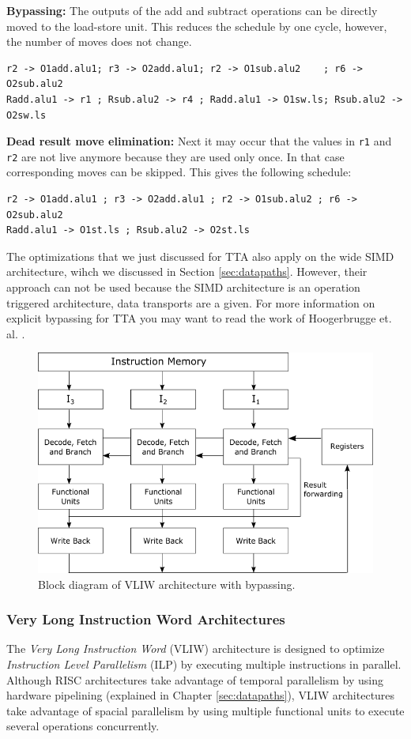 \textbf{Bypassing:} The outputs of the add and subtract operations can be directly moved to the load-store unit. This reduces the schedule by one cycle, however, the number of moves does not change.

\begin{lstlisting}
r2 -> O1add.alu1; r3 -> O2add.alu1; r2 -> O1sub.alu2    ; r6 -> O2sub.alu2
Radd.alu1 -> r1 ; Rsub.alu2 -> r4 ; Radd.alu1 -> O1sw.ls; Rsub.alu2 -> O2sw.ls
\end{lstlisting}

\textbf{Dead result move elimination:} Next it may occur that the values in \texttt{r1} and \texttt{r2} are not live anymore because they are used only once. In that case corresponding moves can be skipped. This gives the following schedule:

\begin{lstlisting}
r2 -> O1add.alu1 ; r3 -> O2add.alu1 ; r2 -> O1sub.alu2 ; r6 -> O2sub.alu2 
Radd.alu1 -> O1st.ls ; Rsub.alu2 -> O2st.ls
\end{lstlisting}

The optimizations that we just discussed for TTA also apply on the wide SIMD architecture, wihch we discussed in Section \ref{sec:datapaths}. However, their approach can not be used because the SIMD architecture is an operation triggered architecture, data transports are a given. For more information on explicit bypassing for TTA you may want to read the work of Hoogerbrugge et. al. \cite{tta, tta_codegen}.


\begin{figure}[b!]
\centering
\includegraphics[width=.65\textwidth]{figures/vliw_forwarding}
\caption{Block diagram of VLIW architecture with bypassing.}
\label{fig:vliw}
\end{figure}

\subsubsection{Very Long Instruction Word Architectures}
The \emph{Very Long Instruction Word} (VLIW) architecture is designed to optimize \emph{Instruction Level Parallelism} (ILP) by executing multiple instructions in parallel.
Although RISC architectures take advantage of temporal parallelism by using hardware pipelining (explained in Chapter \ref{sec:datapaths}), VLIW architectures take advantage of spacial parallelism by using multiple functional units to execute several operations concurrently. 

